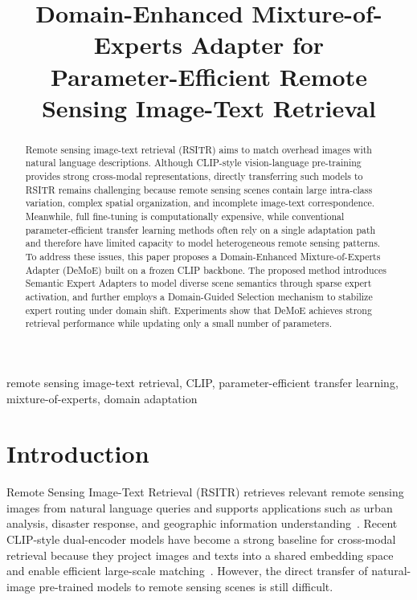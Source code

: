 \documentclass[conference]{IEEEtran}
\begin{document}
\title{Domain-Enhanced Mixture-of-Experts Adapter for\\
Parameter-Efficient Remote Sensing Image-Text Retrieval}

\author{
}

\maketitle

\begin{abstract}
Remote sensing image-text retrieval (RSITR) aims to match overhead images with natural language descriptions. Although CLIP-style vision-language pre-training provides strong cross-modal representations, directly transferring such models to RSITR remains challenging because remote sensing scenes contain large intra-class variation, complex spatial organization, and incomplete image-text correspondence. Meanwhile, full fine-tuning is computationally expensive, while conventional parameter-efficient transfer learning methods often rely on a single adaptation path and therefore have limited capacity to model heterogeneous remote sensing patterns. To address these issues, this paper proposes a Domain-Enhanced Mixture-of-Experts Adapter (DeMoE) built on a frozen CLIP backbone. The proposed method introduces Semantic Expert Adapters to model diverse scene semantics through sparse expert activation, and further employs a Domain-Guided Selection mechanism to stabilize expert routing under domain shift. Experiments show that DeMoE achieves strong retrieval performance while updating only a small number of parameters.
\end{abstract}

\begin{IEEEkeywords}
remote sensing image-text retrieval, CLIP, parameter-efficient transfer learning, mixture-of-experts, domain adaptation
\end{IEEEkeywords}

\section{Introduction}
Remote Sensing Image-Text Retrieval (RSITR) retrieves relevant remote sensing images from natural language queries and supports applications such as urban analysis, disaster response, and geographic information understanding~\cite{ref1,ref4}. Recent CLIP-style dual-encoder models have become a strong baseline for cross-modal retrieval because they project images and texts into a shared embedding space and enable efficient large-scale matching~\cite{ref3}. However, the direct transfer of natural-image pre-trained models to remote sensing scenes is still difficult.
\end{document}
